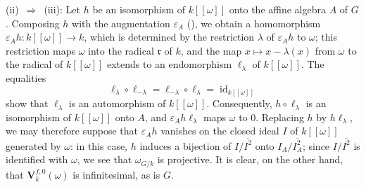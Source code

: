 \medskip
\noindent\textup{(ii)}~\(\Rightarrow\)~\textup{(iii)}: Let \(h\) be an isomorphism of
\(k[[\omega]]\) onto the affine algebra \(A\) of \(G\). Composing \(h\) with the
augmentation \(\varepsilon_A\) \textup{()}, we obtain a homomorphism
\(\varepsilon_Ah:k[[\omega]]\to k\), which is determined by the restriction
\(\lambda\) of \(\varepsilon_Ah\) to \(\omega\); this restriction maps
\(\omega\) into the radical \(\mathfrak r\) of \(k\), and the map
\(x\mapsto x-\lambda(x)\) from \(\omega\) to the radical of \(k[[\omega]]\)
extends to an endomorphism \(\ell_\lambda\) of \(k[[\omega]]\). The equalities
\[
  \ell_\lambda\circ\ell_{-\lambda}
  =
  \ell_{-\lambda}\circ\ell_\lambda
  =
  \operatorname{id}_{k[[\omega]]}
\]
show that \(\ell_\lambda\) is an automorphism of \(k[[\omega]]\).
Consequently, \(h\circ\ell_\lambda\) is an isomorphism of \(k[[\omega]]\)
onto \(A\), and \(\varepsilon_Ah\ell_\lambda\) maps \(\omega\) to \(0\).
Replacing \(h\) by \(h\ell_\lambda\), we may therefore suppose that
\(\varepsilon_Ah\) vanishes on the closed ideal \(I\) of \(k[[\omega]]\)
generated by \(\omega\): in this case, \(h\) induces a bijection of
\(I/\overline{I^2}\) onto \(I_A/\overline{I_A^2}\); since
\(I/\overline{I^2}\) is identified with \(\omega\), we see that
\(\omega_{G/k}\) is projective. It is clear, on the other hand, that
\(\mathbf V_k^{f,0}(\omega)\) is infinitesimal, as is \(G\).

